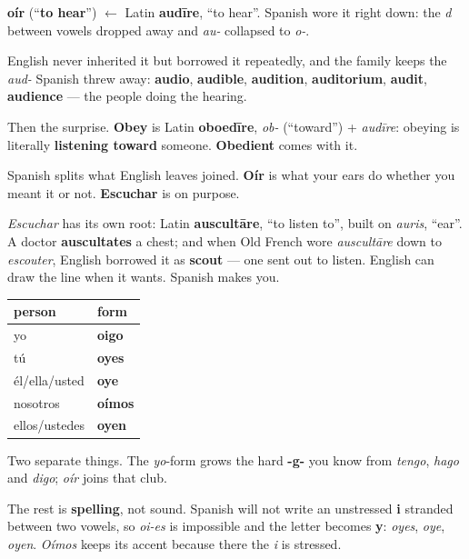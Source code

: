\begin{cousinweb}
\textbf{oír} (\textquotedblleft{}\textbf{to hear}\textquotedblright{}) $\leftarrow$ Latin \textbf{audīre}, \textquotedblleft{}to hear\textquotedblright{}. Spanish wore it right down: the \emph{d} between vowels dropped away and \emph{au-} collapsed to \emph{o-}.

English never inherited it but borrowed it repeatedly, and the family keeps the \emph{aud-} Spanish threw away: \textbf{audio}, \textbf{audible}, \textbf{audition}, \textbf{auditorium}, \textbf{audit}, \textbf{audience} — the people doing the hearing.

Then the surprise. \textbf{Obey} is Latin \textbf{oboedīre}, \emph{ob-} (\textquotedblleft{}toward\textquotedblright{}) + \emph{audīre}: obeying is literally \textbf{listening toward} someone. \textbf{Obedient} comes with it.
\end{cousinweb}

\begin{culture}
Spanish splits what English leaves joined. \textbf{Oír} is what your ears do whether you meant it or not. \textbf{Escuchar} is on purpose.

\emph{Escuchar} has its own root: Latin \textbf{auscultāre}, \textquotedblleft{}to listen to\textquotedblright{}, built on \emph{auris}, \textquotedblleft{}ear\textquotedblright{}. A doctor \textbf{auscultates} a chest; and when Old French wore \emph{auscultāre} down to \emph{escouter}, English borrowed it as \textbf{scout} — one sent out to listen. English can draw the line when it wants. Spanish makes you.
\end{culture}

\begin{grammarlens}[title={Grammar Lens: the -go yo-form, and a spelling rule}]
\noindent
\begin{tabularx}{\linewidth}{@{}>{\raggedright\arraybackslash}X>{\raggedright\arraybackslash}X@{}}
\toprule
\textbf{person} & \textbf{form} \\
\midrule
yo & \textbf{oigo} \\
tú & \textbf{oyes} \\
él/ella/usted & \textbf{oye} \\
nosotros & \textbf{oímos} \\
ellos/ustedes & \textbf{oyen} \\
\bottomrule
\end{tabularx}

Two separate things. The \emph{yo}-form grows the hard \textbf{-g-} you know from \emph{tengo}, \emph{hago} and \emph{digo}; \emph{oír} joins that club.

The rest is \textbf{spelling}, not sound. Spanish will not write an unstressed \textbf{i} stranded between two vowels, so \emph{oi-es} is impossible and the letter becomes \textbf{y}: \emph{oyes}, \emph{oye}, \emph{oyen}. \emph{Oímos} keeps its accent because there the \emph{i} is stressed.
\end{grammarlens}

